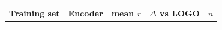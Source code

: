 \begin{tabular}{llrrr}
\toprule
Training set & Encoder & mean $r$ & $\Delta$ vs LOGO & $n$ \\
\midrule
\multicolumn{5}{c}{\pending{}} \\
\bottomrule
\end{tabular}
